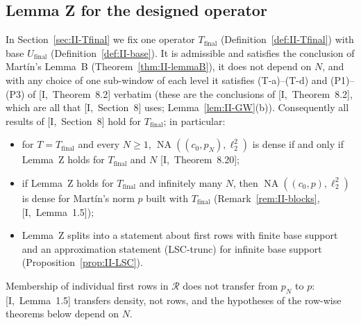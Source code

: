 \documentclass[10pt]{amsart}
\theoremstyle{definition}
\theoremstyle{remark}
\newcommand{\NA}{\operatorname{NA}}
\newcommand{\Rec}{\mathcal R}
\begin{document}
\subsection{Lemma Z for the designed operator}
In Section~\ref{sec:II-Tfinal} we fix one operator $T_{\mathrm{final}}$
(Definition~\ref{def:II-Tfinal}) with base $U_{\mathrm{final}}$
(Definition~\ref{def:II-base}).  It is admissible and satisfies the
conclusion of Mart\'in's Lemma~B (Theorem~\ref{thm:II-lemmaB}), it does
not depend on $N$, and with any choice of one sub-window of each level it
satisfies (T-a)--(T-d) and (P1)--(P3) of [I,~Theorem~8.2] verbatim (these
are the conclusions of [I,~Theorem~8.2], which are all that [I,~Section~8]
uses; Lemma~\ref{lem:II-GW}(b)).  Consequently all results of [I,~Section~8]
hold for $T_{\mathrm{final}}$; in particular:
\begin{itemize}
\item for $T=T_{\mathrm{final}}$ and every $N\ge1$,
$\NA((c_0,p_N),\ell_2^2)$ is dense if and only if Lemma~Z holds for
$T_{\mathrm{final}}$ and $N$ [I,~Theorem~8.20];
\item if Lemma~Z holds for $T_{\mathrm{final}}$ and infinitely many $N$,
then $\NA((c_0,p),\ell_2^2)$ is dense for Mart\'in's norm $p$ built with
$T_{\mathrm{final}}$ (Remark~\ref{rem:II-blocks}, [I,~Lemma~1.5]);
\item Lemma~Z splits into a statement about first rows with finite base
support and an approximation statement (LSC-trunc) for infinite base
support (Proposition~\ref{prop:II-LSC}).
\end{itemize}
Membership of individual first rows in $\Rec$ does not transfer from $p_N$
to $p$: [I,~Lemma~1.5] transfers density, not rows, and the hypotheses of
the row-wise theorems below depend on $N$.
\end{document}
